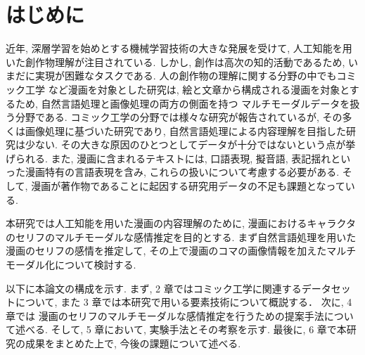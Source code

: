 \newpage
\changeindent{0cm}
\section{はじめに}
\changeindent{2cm}
近年, 深層学習を始めとする機械学習技術の大きな発展を受けて, 人工知能を用いた創作物理解が注目されている.
しかし, 創作は高次の知的活動であるため, いまだに実現が困難なタスクである.
人の創作物の理解に関する分野の中でもコミック工学 \cite{comic} など漫画を対象とした研究は,
絵と文章から構成される漫画を対象とするため, 自然言語処理と画像処理の両方の側面を持つ
マルチモーダルデータを扱う分野である.
コミック工学の分野では様々な研究が報告されているが,
その多くは画像処理に基づいた研究であり,
自然言語処理による内容理解を目指した研究は少ない.
その大きな原因のひとつとしてデータが十分ではないという点が挙げられる.
また, 漫画に含まれるテキストには, 口語表現, 擬音語, 表記揺れといった漫画特有の言語表現を含み,
これらの扱いについて考慮する必要がある.
そして, 漫画が著作物であることに起因する研究用データの不足も課題となっている.

本研究では人工知能を用いた漫画の内容理解のために,
漫画におけるキャラクタのセリフのマルチモーダルな感情推定を目的とする.
まず自然言語処理を用いた漫画のセリフの感情を推定して,
その上で漫画のコマの画像情報を加えたマルチモーダル化について検討する.

以下に本論文の構成を示す.
まず, 2 章ではコミック工学に関連するデータセットについて,
また 3 章では本研究で用いる要素技術について概説する．
次に, 4 章では
漫画のセリフのマルチモーダルな感情推定を行うための提案手法について述べる.
そして, 5 章において, 実験手法とその考察を示す.
最後に, 6 章で本研究の成果をまとめた上で, 今後の課題について述べる.
